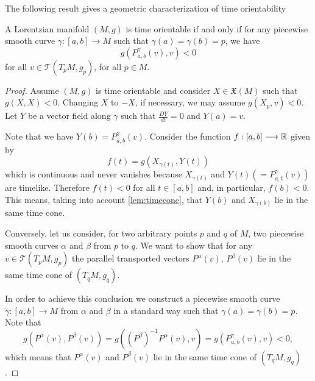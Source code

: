 

The following result gives a geometric characterization of time orientability \cite[p. 255]{sachs77}


\begin{corollary}\label{parallel_transport}

    A Lorentzian manifold $(M,g)$ is time orientable if and only if for any piecewise smooth curve $\gamma : [a,b] \longrightarrow M$ such that $\gamma(a)=\gamma(b)=p$, we have
    \[
    g(P_{a,b}^{\gamma}(v),v)<0
    \]
    for all $v\in \mathcal{T}(T_pM,g_p)$, for all $p \in M$.

\end{corollary}

\begin{proof}
    Assume $(M,g)$ is time orientable and consider $X \in \mathfrak{X}(M)$ such that $g(X,X)<0$. Changing $X$ to $-X$, if necessary, we may assume $g(X_p,v)<0$. Let $Y$ be a vector field along $\gamma$ such that $\frac{DY}{dt}=0$ and $Y(a)=v$.

    Note that we have $Y(b)=P_{a,b}^{\gamma}(v)$. Consider the function $f : [a,b] \longrightarrow \mathbb{R}$ given by
    \[
        f(t)= g(X_{\gamma(t)},Y(t))
    \]
    which is continuous and never vanishes because $X_{\gamma(t)}$ and $Y(t)(=P_{a,t}^{\gamma}(v))$ are timelike. Therefore $f(t)<0$ for all $t\in [a,b]$ and, in particular, $f(b)<0$. This means, taking into account \autoref{lem:timecone}, that $Y(b)$ and $X_{\gamma(b)}$ lie in the same time cone.

    Conversely, let us consider, for two arbitrary points $p$ and $q$ of $M$, two piecewise smooth curves $\alpha$ and $\beta$ from $p$ to $q$. We want to show that for any $v\in \mathcal{T}(T_pM,g_p)$ the parallel transported vectors $P^{\alpha}(v)$, $P^{\beta}(v)$ lie in the same time cone of $(T_qM,g_q)$.

    In order to achieve this conclusion we construct a piecewise smooth curve $\gamma : [a,b] \longrightarrow M$ from $\alpha$ and $\beta$ in a standard way such that $\gamma(a)=\gamma(b)=p$. Note that $$g(P^{\alpha}(v),P^{\beta}(v))=g((P^{\beta})^{-1}P^{\alpha}(v),v)=g(P_{a,b}^{\gamma}(v),v)<0,$$ which means that $P^{\alpha}(v)$ and $P^{\beta}(v)$ lie in the same time cone of $(T_qM,g_q)$.


\end{proof}
